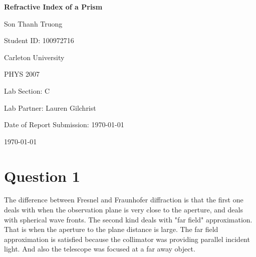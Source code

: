 \documentclass[12pt,letterpaper]{article}
\begin{document}
\begin{titlepage}
    \centering
    \vspace*{3cm}

    {\Huge\bfseries Refractive Index of a Prism\par}

    \vspace{2cm}

    {\Large Son Thanh Truong\par}
    {\Large Student ID: 100972716\par}
    \vspace{0.5cm}
    {\large Carleton University\par}
    {\large PHYS 2007\par}
    {\large Lab Section: C\par}
    {\large Lab Partner: Lauren Gilchrist\par}
    {\large Date of Report Submission: \today\par}
    
    
    \vfill

    {\large \today\par}
\end{titlepage}






\section{Question 1}

The difference between Fresnel and Fraunhofer diffraction is that
the first one deals with when the observation plane is very close 
to the aperture, and deals with spherical wave fronts. The second
kind deals with "far field" approximation. That is when the aperture
to the plane distance is large. The far field approximation is
satisfied because the collimator was providing parallel incident light.
And also the telescope was focused at a far away object.
\end{document}
